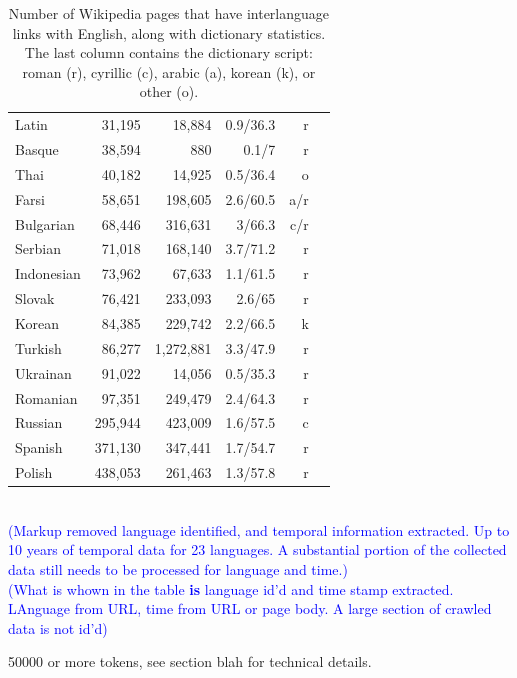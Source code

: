 \documentclass{article}
\newcommand{\mnote}[1]{\marginpar{%
  \vskip-\baselineskip
  \raggedright\footnotesize
  \itshape\hrule\smallskip\tiny{#1}\par\smallskip\hrule}}
\newcommand{\todo}[1]{\textcolor{blue}{(#1)}}
\newcommand{\mtodo}[1]{\mnote{\textcolor{red}{#1}}}
\begin{document}
\begin{table}[h!]
\begin{center}
\begin{tabular}{lrrrrr}
Latin 	&	31,195	&	18,884	&	0.9/36.3	&	r\\
Basque 	&	38,594	&	880	&	0.1/7	&	r\\
Thai	&	40,182	&14,925	&	0.5/36.4	&	o\\
Farsi	&	58,651	&198,605	&	2.6/60.5	&	a/r\\
Bulgarian 	&	68,446	&	316,631	&	3/66.3	&	c/r\\
Serbian	&	71,018	&	168,140	&	3.7/71.2	&	r\\
Indonesian 	&	73,962	&	67,633	&	1.1/61.5	&	r\\
Slovak 	&	76,421	&	233,093	&	2.6/65	&	r\\
Korean	&	84,385	&	229,742	&	2.2/66.5	&	k\\
Turkish 	&	86,277	&	1,272,881	&	3.3/47.9	&	r\\
Ukrainan	&	91,022	&	14,056	&	0.5/35.3	&	r\\
Romanian	&	97,351	&	249,479	&	2.4/64.3	&	r\\
Russian	&	295,944	&	423,009	&	1.6/57.5	&	c\\
Spanish 	&	371,130	&	347,441	&	1.7/54.7	&	r\\
Polish	&	438,053	&	261,463	&	1.3/57.8	&	r\\
\end{tabular}
\end{center}
\normalsize
\caption{Number of Wikipedia pages that have interlanguage links with English, along with dictionary statistics.  The last column contains the dictionary script: roman (r), cyrillic (c), arabic (a), korean (k), or other (o).}
\label{fig:wikidictstats}
\end{table}

\mtodo{Cannot find the coverage run logs.  Compare some to Ben's runs.  Check dict num tokens.}


\\ 

\todo{Markup removed language identified, and temporal information extracted. Up to 10 years of temporal data for 23 languages. A substantial portion of the collected data still needs to be processed for language and time.}\\

\todo{What is whown in the table {\bf is} language id'd and time stamp extracted.  LAnguage from URL, time from URL or page body. A large section of crawled data is not id'd}

50000 or more tokens, see section blah for technical details.
\end{document}
